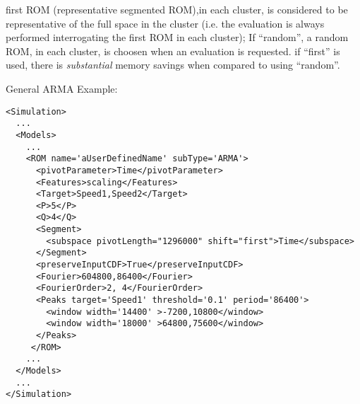 \begin{itemize}
\begin{itemize}
        first ROM (representative segmented ROM),in each cluster, is considered to
         be representative of the full space in the cluster (i.e. the evaluation is always performed
         interrogating the first ROM in each cluster); If ``random'', a random ROM, in each cluster,
         is choosen when an evaluation is requested.
   \nb if ``first'' is used, there is \emph{substantial} memory savings when compared to using
   ``random''.
    \end{itemize}
\end{itemize}

\hspace{24pt}
General ARMA Example:
\begin{lstlisting}[style=XML, morekeywords={name,subType,pivotLength,shift,target,threshold,period,width}]
<Simulation>
  ...
  <Models>
    ...
    <ROM name='aUserDefinedName' subType='ARMA'>
      <pivotParameter>Time</pivotParameter>
      <Features>scaling</Features>
      <Target>Speed1,Speed2</Target>
      <P>5</P>
      <Q>4</Q>
      <Segment>
        <subspace pivotLength="1296000" shift="first">Time</subspace>
      </Segment>
      <preserveInputCDF>True</preserveInputCDF>
      <Fourier>604800,86400</Fourier>
      <FourierOrder>2, 4</FourierOrder>
      <Peaks target='Speed1' threshold='0.1' period='86400'>
        <window width='14400' >-7200,10800</window>
        <window width='18000' >64800,75600</window>
      </Peaks>
     </ROM>
    ...
  </Models>
  ...
</Simulation>
\end{lstlisting}


